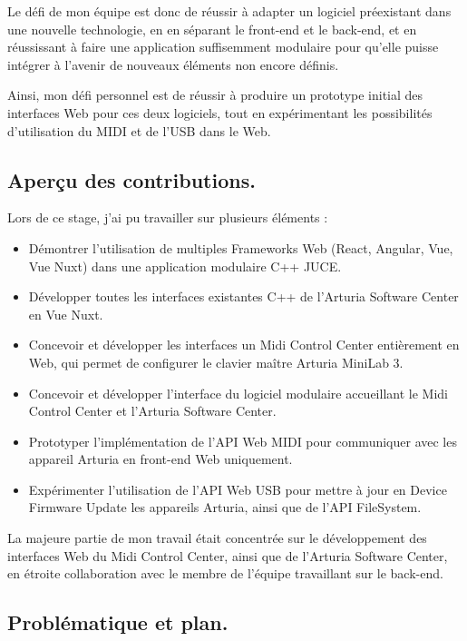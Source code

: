 \documentclass[francais]{rapportPFE}  %
\begin{document}
Le défi de mon équipe est donc de réussir à adapter un logiciel préexistant dans une nouvelle technologie, en en séparant le front-end et le back-end, et en réussissant à faire une application suffisemment modulaire pour qu'elle puisse intégrer à l'avenir de nouveaux éléments non encore définis.

Ainsi, mon défi personnel est de réussir à produire un prototype initial des interfaces Web pour ces deux logiciels, tout en expérimentant les possibilités d'utilisation du MIDI et de l'USB dans le Web.



\subsection{Aperçu des contributions.}
Lors de ce stage, j'ai pu travailler sur plusieurs éléments : 
\begin{itemize}
    \setlength\itemsep{0em}
    \item Démontrer l'utilisation de multiples Frameworks Web (React, Angular, Vue, Vue Nuxt) dans une application modulaire C++ JUCE.
    \item Développer toutes les interfaces existantes C++ de l'Arturia Software Center en Vue Nuxt.
    \item Concevoir et développer les interfaces un Midi Control Center entièrement en Web, qui permet de configurer le clavier maître Arturia MiniLab 3.
    \item Concevoir et développer l'interface du logiciel modulaire accueillant le Midi Control Center et l'Arturia Software Center.
    \item Prototyper l'implémentation de l'API Web MIDI pour communiquer avec les appareil Arturia en front-end Web uniquement.
    \item Expérimenter l'utilisation de l'API Web USB pour mettre à jour en Device Firmware Update les appareils Arturia, ainsi que de l'API FileSystem.
\end{itemize}
La majeure partie de mon travail était concentrée sur le développement des interfaces Web du Midi Control Center, ainsi que de l'Arturia Software Center, en étroite collaboration avec le membre de l'équipe travaillant sur le back-end. 

\subsection{Problématique et plan.}
\end{document}
